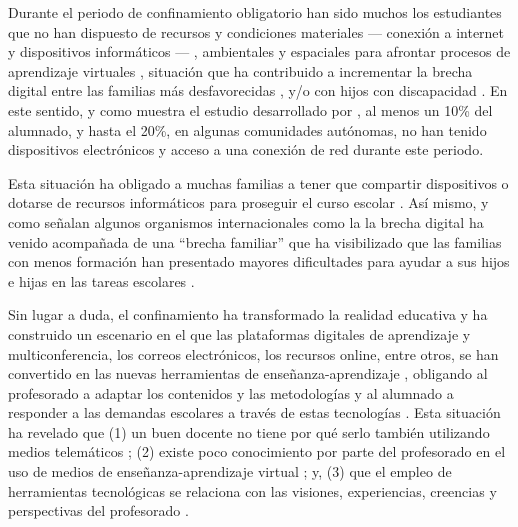 \documentclass[spanish]{textolivre}
\begin{document}
Durante el periodo de confinamiento obligatorio han sido muchos los estudiantes que no han dispuesto de recursos y condiciones materiales — conexión a internet y dispositivos informáticos — \cite{menendez2020, rogero2020}, %
ambientales y espaciales para afrontar procesos de aprendizaje virtuales \cite{fernandez2020, murillo2020}, %
situación que ha contribuido a incrementar la brecha digital entre las familias más desfavorecidas \cite{albala2020, sadio2020}, %
y/o con hijos con discapacidad \cite{berastegui2020}. %
En este sentido, y como muestra el estudio desarrollado por \textcite{cabreraperez2020}, %
al menos un 10\% del alumnado, y hasta el 20\%, en algunas comunidades autónomas, no han tenido dispositivos electrónicos y acceso a una conexión de red durante este periodo. 

Esta situación ha obligado a muchas familias a tener que compartir dispositivos o dotarse de recursos informáticos para proseguir el curso escolar \cite{munoz2020}. %
Así mismo, y como señalan algunos organismos internacionales como la 
\textcite{unesco2016,unicef2020,ocde2020}
la brecha digital ha venido acompañada de una “brecha familiar” que ha visibilizado que las familias con menos formación han presentado mayores dificultades para ayudar a sus hijos e hijas en las tareas escolares \cite{cabrera2020}. %

Sin lugar a duda, el confinamiento ha transformado la realidad educativa y ha construido un escenario en el que las plataformas digitales de aprendizaje y multiconferencia, los correos electrónicos, los recursos online, entre otros, se han convertido en las nuevas herramientas de enseñanza-aprendizaje \cite{menendez2020}, %
obligando al profesorado a adaptar los contenidos y las metodologías y al alumnado a responder a las demandas escolares a través de estas tecnologías \cite{rogero2020}. %
Esta situación ha revelado que (1) un buen docente no tiene por qué serlo también utilizando medios telemáticos \cite{fernandezdomingues2020}; %
(2) existe poco conocimiento por parte del profesorado en el uso de medios de enseñanza-aprendizaje virtual \cite{rogero2020}; %
y, (3) que el empleo de herramientas tecnológicas se relaciona con las visiones, experiencias, creencias y perspectivas del profesorado \cite{marin2020}. %
\end{document}
